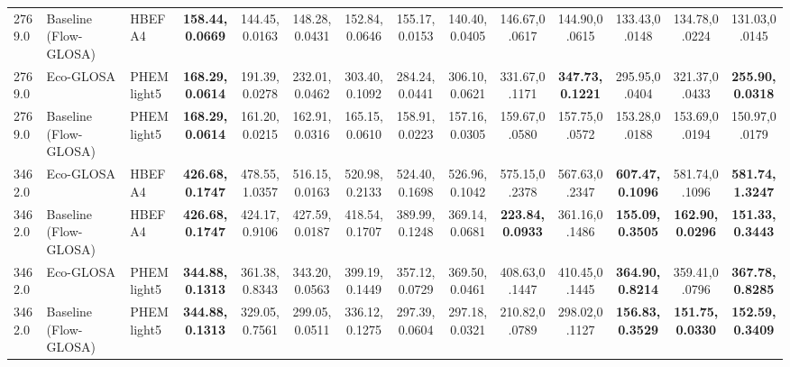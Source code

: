 \begin{table}[htb]
{\begin{tabular}{l l l *{11}{c}}
      2769.0 & Baseline (Flow-GLOSA)   & HBEFA4       & \textbf{158.44,0.0669}   & 144.45,0.0163 & 148.28,0.0431 & 152.84,0.0646 & 155.17,0.0153 & 140.40,0.0405 & 146.67,0.0617 & 144.90,0.0615 & 133.43,0.0148 & 134.78,0.0224 & 131.03,0.0145 \\
      2769.0 & Eco-GLOSA               & PHEMlight5   & \textbf{168.29,0.0614}   & 191.39,0.0278 & 232.01,0.0462 & 303.40,0.1092 & 284.24,0.0441 & 306.10,0.0621 & 331.67,0.1171 & \textbf{347.73,0.1221} & 295.95,0.0404 & 321.37,0.0433 & \textbf{255.90,0.0318} \\
      2769.0 & Baseline (Flow-GLOSA)   & PHEMlight5   & \textbf{168.29,0.0614}   & 161.20,0.0215 & 162.91,0.0316 & 165.15,0.0610 & 158.91,0.0223 & 157.16,0.0305 & 159.67,0.0580 & 157.75,0.0572 & 153.28,0.0188 & 153.69,0.0194 & 150.97,0.0179 \\
      \midrule
      3462.0 & Eco-GLOSA               & HBEFA4       & \textbf{426.68,0.1747}   & 478.55,1.0357 & 516.15,0.0163 & 520.98,0.2133 & 524.40,0.1698 & 526.96,0.1042 & 575.15,0.2378 & 567.63,0.2347 & \textbf{607.47,0.1096} & 581.74,0.1096 & \textbf{581.74,1.3247} \\
      3462.0 & Baseline (Flow-GLOSA)   & HBEFA4       & \textbf{426.68,0.1747}   & 424.17,0.9106 & 427.59,0.0187 & 418.54,0.1707 & 389.99,0.1248 & 369.14,0.0681 & \textbf{223.84,0.0933} & 361.16,0.1486 & \textbf{155.09,0.3505} & \textbf{162.90,0.0296} & \textbf{151.33,0.3443} \\
      3462.0 & Eco-GLOSA               & PHEMlight5   & \textbf{344.88,0.1313}   & 361.38,0.8343 & 343.20,0.0563 & 399.19,0.1449 & 357.12,0.0729 & 369.50,0.0461 & 408.63,0.1447 & 410.45,0.1445 & \textbf{364.90,0.8214} & 359.41,0.0796 & \textbf{367.78,0.8285} \\
      3462.0 & Baseline (Flow-GLOSA)   & PHEMlight5   & \textbf{344.88,0.1313}   & 329.05,0.7561 & 299.05,0.0511 & 336.12,0.1275 & 297.39,0.0604 & 297.18,0.0321 & 210.82,0.0789 & 298.02,0.1127 & \textbf{156.83,0.3529} & \textbf{151.75,0.0330} & \textbf{152.59,0.3409} \\
      \bottomrule
    \end{tabular}%
  }
\end{table}

